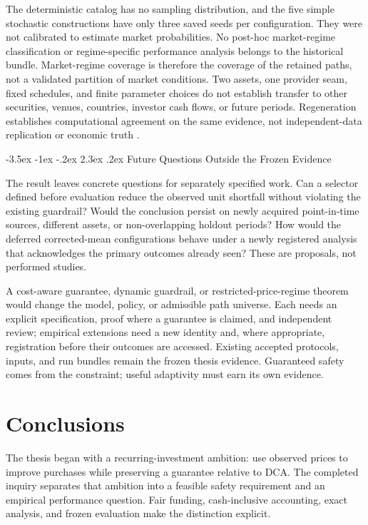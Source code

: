 \documentclass[12pt,a4paper,oneside]{report}
\makeatletter
\renewcommand\section{\@startsection{section}{1}{\z@}%
  {-3.5ex \@plus -1ex \@minus -.2ex}%
  {2.3ex \@plus .2ex}%
  {\normalfont\fontsize{14}{17}\selectfont\bfseries}}
\makeatother
\begin{document}
The deterministic catalog has no sampling distribution, and the five simple
stochastic constructions have only three saved seeds per configuration. They
were not calibrated to estimate market probabilities. No post-hoc market-regime
classification or regime-specific performance analysis belongs to the
historical bundle. Market-regime coverage is therefore the coverage of the
retained paths, not a validated partition of market conditions. Two assets,
one provider seam, fixed schedules, and finite parameter choices do not
establish transfer to other securities, venues, countries, investor cash flows,
or future periods. Regeneration establishes computational agreement on the
same evidence, not independent-data replication or economic truth
\citep{nasem2019reproducibility}.

\section{Future Questions Outside the Frozen Evidence}
\label{sec:discussion-future-research}

The result leaves concrete questions for separately specified work. Can a
selector defined before evaluation reduce the observed unit shortfall without
violating the existing guardrail? Would the conclusion persist on newly
acquired point-in-time sources, different assets, or non-overlapping holdout
periods? How would the deferred corrected-mean configurations behave under a
newly registered analysis that acknowledges the primary outcomes already
seen? These are proposals, not performed studies.

A cost-aware guarantee, dynamic guardrail, or restricted-price-regime theorem
would change the model, policy, or admissible path universe. Each needs an
explicit specification, proof where a guarantee is claimed, and independent
review; empirical extensions need a new identity and, where appropriate,
registration before their outcomes are accessed. Existing accepted protocols,
inputs, and run bundles remain the frozen thesis evidence. Guaranteed safety comes from the constraint; useful adaptivity must earn its
own evidence.

\chapter{Conclusions}
\label{ch:conclusion}

The thesis began with a recurring-investment ambition: use observed prices to
improve purchases while preserving a guarantee relative to DCA. The completed
inquiry separates that ambition into a feasible safety requirement and an
empirical performance question. Fair funding, cash-inclusive accounting,
exact analysis, and frozen evaluation make the distinction explicit.
\end{document}
